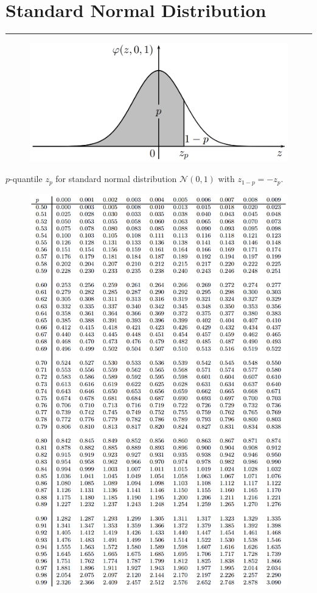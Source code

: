 \section{Standard Normal Distribution}
\noindent\rule[\linienAbstand]{\linewidth}{\linienDickeDick}
\begin{figure}[H]
  \centering
  \includegraphics[width=.7\linewidth]{Pics/T.2.img.png}
\end{figure}
$p$-quantile $z_p$ for standard normal distribution $\mathcal{N}(0, 1)$ with $z_{1-p} = -z_p$.
\begin{figure}[H]
  \centering
  \includegraphics[width=\linewidth]{Pics/T.2.png}
\end{figure}
\vfill\null
\columnbreak

